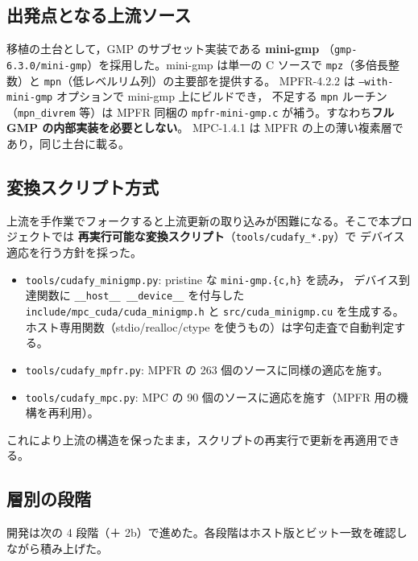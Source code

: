 \documentclass[uplatex,dvipdfmx,a4paper,11pt]{jsarticle}
\newcommand{\code}[1]{\texttt{#1}}
\begin{document}
\subsection{出発点となる上流ソース}

移植の土台として，GMP のサブセット実装である \textbf{mini-gmp}
（\code{gmp-6.3.0/mini-gmp}）を採用した。mini-gmp は単一の C ソースで
\code{mpz}（多倍長整数）と \code{mpn}（低レベルリム列）の主要部を提供する。
MPFR-4.2.2 は \code{--with-mini-gmp} オプションで mini-gmp 上にビルドでき，
不足する \code{mpn} ルーチン（\code{mpn\_divrem} 等）は MPFR 同梱の
\code{mpfr-mini-gmp.c} が補う。すなわち\textbf{フル GMP の内部実装を必要としない}。
MPC-1.4.1 は MPFR の上の薄い複素層であり，同じ土台に載る。

\subsection{変換スクリプト方式}

上流を手作業でフォークすると上流更新の取り込みが困難になる。そこで本プロジェクトでは
\textbf{再実行可能な変換スクリプト}（\code{tools/cudafy\_*.py}）で
デバイス適応を行う方針を採った。

\begin{itemize}
\item \code{tools/cudafy\_minigmp.py}: pristine な \code{mini-gmp.\{c,h\}} を読み，
      デバイス到達関数に \code{\_\_host\_\_ \_\_device\_\_} を付与した
      \code{include/mpc\_cuda/cuda\_minigmp.h} と \code{src/cuda\_minigmp.cu} を生成する。
      ホスト専用関数（stdio/realloc/ctype を使うもの）は字句走査で自動判定する。
\item \code{tools/cudafy\_mpfr.py}: MPFR の 263 個のソースに同様の適応を施す。
\item \code{tools/cudafy\_mpc.py}: MPC の 90 個のソースに適応を施す（MPFR 用の機構を再利用）。
\end{itemize}

これにより上流の構造を保ったまま，スクリプトの再実行で更新を再適用できる。

\subsection{層別の段階}

開発は次の 4 段階（＋ 2b）で進めた。各段階はホスト版とビット一致を確認しながら積み上げた。
\end{document}
